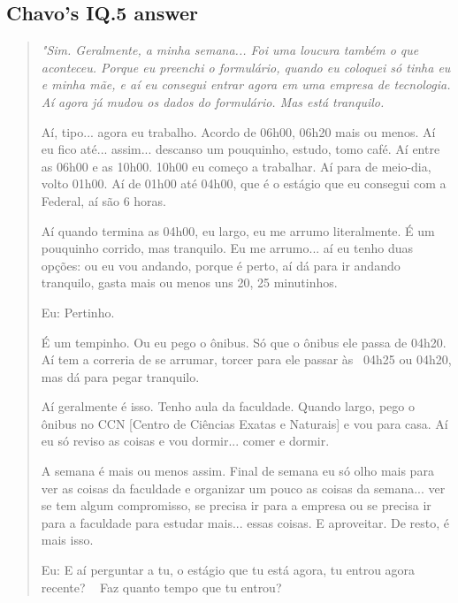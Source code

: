 
\subsection{Chavo’s IQ.5 answer}
\label{interview-exc-ss:chavo-iq5}

\begin{quote}
    \itshape
    "Sim. Geralmente, a minha semana... Foi uma loucura também o que aconteceu. Porque eu preenchi o formulário, quando eu coloquei só tinha eu e minha mãe, e aí eu consegui entrar agora em uma empresa de tecnologia. Aí agora já mudou os dados do formulário. Mas está tranquilo. 
    
    Aí, tipo... agora eu trabalho. Acordo de 06h00, 06h20 mais ou menos. Aí eu fico até... assim... descanso um pouquinho, estudo, tomo café. Aí entre as 06h00 e as 10h00. 10h00 eu começo a trabalhar. Aí para de meio-dia, volto 01h00. Aí de 01h00 até 04h00, que é o estágio que eu consegui com a Federal, aí são 6 horas.

    Aí quando termina as 04h00, eu largo, eu me arrumo literalmente. É um pouquinho corrido, mas tranquilo. Eu me arrumo... aí eu tenho duas opções: ou eu vou andando, porque é perto, aí dá para ir andando tranquilo, gasta mais ou menos uns 20, 25 minutinhos.

    \colorbox{black!15}{Eu: Pertinho.}
    
    É um tempinho. Ou eu pego o ônibus. Só que o ônibus ele passa de 04h20. Aí tem a correria de se arrumar, torcer para ele passar às  04h25 ou 04h20, mas dá para pegar tranquilo. 
    
    Aí geralmente é isso. Tenho aula da faculdade. Quando largo, pego o ônibus no CCN [Centro de Ciências Exatas e Naturais] e vou para casa. Aí eu só reviso as coisas e vou dormir... comer e dormir.
    
    A semana é mais ou menos assim. Final de semana eu só olho mais para ver as coisas da faculdade e organizar um pouco as coisas da semana... ver se tem algum compromisso, se precisa ir para a empresa ou se precisa ir para a faculdade para estudar mais... essas coisas. E aproveitar. De resto, é mais isso.

    
    \colorbox{black!15}{Eu: E aí perguntar a tu, o estágio que tu está agora, tu entrou agora recente? \ } \colorbox{black!15}{Faz quanto tempo que tu entrou?}
    

\end{quote}
